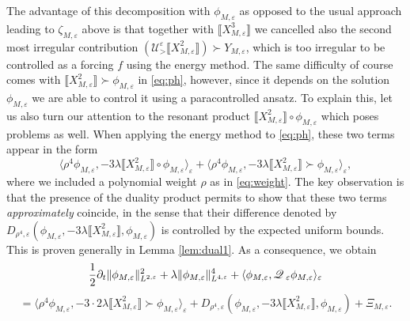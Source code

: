 \documentclass[a4paper,11pt]{article}
\newcommand{\cdummy}{\cdot}
\numberwithin{equation}{section}
\newcommand{\Q}{\mathscr{Q} \hspace{.2em}}
\begin{document}
The advantage of this decomposition with $\phi_{M, \varepsilon}$ as opposed to
the usual approach leading to $\zeta_{M, \varepsilon}$ above is that together
with $\llbracket X^3_{M, \varepsilon} \rrbracket$ we cancelled also the second
most irregular contribution $(\mathscr{U}^{\varepsilon}_{>} \llbracket X_{M,
\varepsilon}^2 \rrbracket) \succ Y_{M, \varepsilon}$, which is too irregular
to be controlled as a forcing $f$ using the energy method. The same difficulty
of course comes with $\llbracket X_{M, \varepsilon}^2 \rrbracket \succ
\phi_{M, \varepsilon}$ in {\eqref{eq:ph}}, however, since it depends on the
solution $\phi_{M, \varepsilon}$ we are able to control it using a
paracontrolled ansatz. To explain this, let us also turn our attention to the
resonant product $\llbracket X_{M, \varepsilon}^2 \rrbracket \circ \phi_{M,
\varepsilon}$ which poses problems as well. When applying the energy method to
{\eqref{eq:ph}}, these two terms appear in the form
\[ \langle \rho^4 \phi_{M, \varepsilon}, - 3 \lambda \llbracket X_{M,
   \varepsilon}^2 \rrbracket \circ \phi_{M, \varepsilon} \rangle_{\varepsilon}
   + \langle \rho^4 \phi_{M, \varepsilon}, - 3 \lambda \llbracket X_{M,
   \varepsilon}^2 \rrbracket \succ \phi_{M, \varepsilon}
   \rangle_{\varepsilon}, \]
where we included a polynomial weight $\rho$ as in \eqref{eq:weight}. The key observation is that the
presence of the duality product permits to show that these two terms
{\em{approximately}} coincide, in the sense that their difference denoted by
$D_{\rho^4, \varepsilon} (\phi_{M, \varepsilon}, - 3 \lambda \llbracket
X^2_{M, \varepsilon} \rrbracket, \phi_{M, \varepsilon})$ is controlled by the
expected uniform bounds. This is proven generally in Lemma \ref{lem:dual1}. As a
consequence, we obtain
\[ \frac{1}{2} \partial_t \| \phi_{M, \varepsilon} \|_{L^{2, \varepsilon}}^2 +
   \lambda \| \phi_{M, \varepsilon} \|_{L^{4, \varepsilon}}^4 + \langle
   \phi_{M, \varepsilon}, \Q_{\varepsilon}\phi_{M, \varepsilon}
   \rangle_{\varepsilon} \]
\[ = \langle \rho^4 \phi_{M, \varepsilon}, - 3 \cdummy 2 \lambda \llbracket
   X_{M, \varepsilon}^2 \rrbracket \succ \phi_{M, \varepsilon}
   \rangle_{\varepsilon} + D_{\rho^4, \varepsilon} (\phi_{M, \varepsilon}, - 3
   \lambda \llbracket X^2_{M, \varepsilon} \rrbracket, \phi_{M, \varepsilon})
   + \Xi_{M, \varepsilon} . \]
\end{document}
